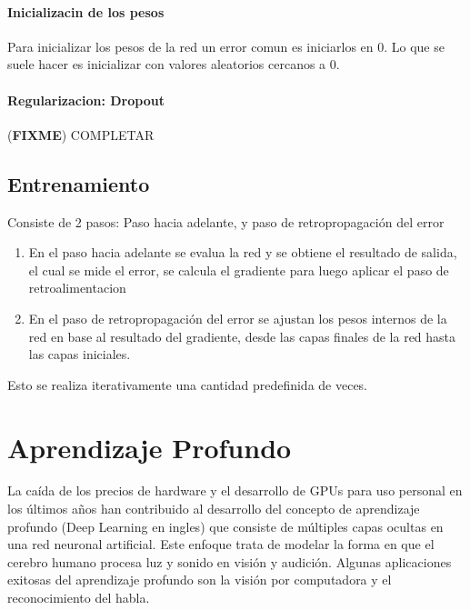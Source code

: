 \documentclass[a4paper,11pt,spanish]{book}
\newcommand*{\FIXME}[1]{{(\textbf{FIXME}) {#1}}}
\begin{document}
    \paragraph {Inicializacin de los pesos}
      Para inicializar los pesos de la red un error comun es iniciarlos en 0. Lo que se suele hacer es inicializar con valores aleatorios cercanos a 0. 

    \paragraph {Regularizacion: Dropout}
      \FIXME{COMPLETAR}

    \subsection {Entrenamiento}
      Consiste de 2 pasos: Paso hacia adelante, y paso de retropropagación del error
      \begin{enumerate}
	\item En el paso hacia adelante se evalua la red y se obtiene el resultado de salida, el cual se mide el error, se calcula el gradiente para luego aplicar el paso de retroalimentacion
	\item En el paso de retropropagación del error se ajustan los pesos internos de la red en base al resultado del gradiente, desde las capas finales de la red hasta las capas iniciales.
      \end{enumerate}
      Esto se realiza iterativamente una cantidad predefinida de veces.

  \section {Aprendizaje Profundo}
    La caída de los precios de hardware y el desarrollo de GPUs para uso personal en los últimos años han contribuido al desarrollo del concepto de aprendizaje profundo (Deep Learning en ingles)
    que consiste de múltiples capas ocultas en una red neuronal artificial. Este enfoque trata de modelar la forma en que el cerebro humano procesa luz y sonido en visión y audición.
    Algunas aplicaciones exitosas del aprendizaje profundo son la visión por computadora y el reconocimiento del habla.
\end{document}
